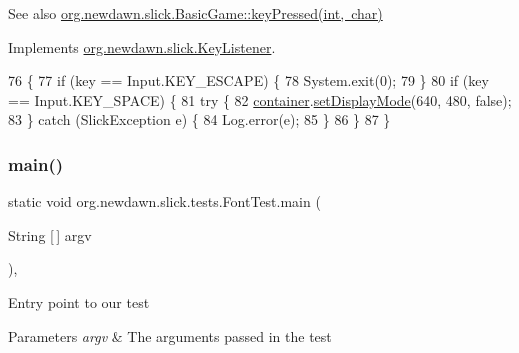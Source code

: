 \begin{DoxySeeAlso}{See also}
\mbox{\hyperlink{classorg_1_1newdawn_1_1slick_1_1_basic_game_a4fbb3345b5abf5ddd54a99466d07f02f}{org.\+newdawn.\+slick.\+Basic\+Game\+::key\+Pressed(int, char)}} 
\end{DoxySeeAlso}


Implements \mbox{\hyperlink{interfaceorg_1_1newdawn_1_1slick_1_1_key_listener_ac0b0568a21ef486c4f51382614c196ef}{org.\+newdawn.\+slick.\+Key\+Listener}}.


\begin{DoxyCode}
76                                             \{
77         \textcolor{keywordflow}{if} (key == Input.KEY\_ESCAPE) \{
78             System.exit(0);
79         \}
80         \textcolor{keywordflow}{if} (key == Input.KEY\_SPACE) \{
81             \textcolor{keywordflow}{try} \{
82                 \mbox{\hyperlink{classorg_1_1newdawn_1_1slick_1_1tests_1_1_font_test_a752b5206f834ae0b0205d67dcb2aa18d}{container}}.\mbox{\hyperlink{classorg_1_1newdawn_1_1slick_1_1_app_game_container_aa2de68db61ddd3917a8edc0177ebdfe3}{setDisplayMode}}(640, 480, \textcolor{keyword}{false});
83             \} \textcolor{keywordflow}{catch} (SlickException e) \{
84                 Log.error(e);
85             \}
86         \}
87     \}
\end{DoxyCode}
\mbox{\label{classorg_1_1newdawn_1_1slick_1_1tests_1_1_font_test_aeaa4c6efeea38900dd2fb188c8661f60}} 
\subsubsection{\texorpdfstring{main()}{main()}}
{\footnotesize\ttfamily static void org.\+newdawn.\+slick.\+tests.\+Font\+Test.\+main (\begin{DoxyParamCaption}\item[{String \mbox{[}$\,$\mbox{]}}]{argv }\end{DoxyParamCaption})\hspace{0.3cm}{\ttfamily [inline]}, {\ttfamily [static]}}

Entry point to our test


\begin{DoxyParams}{Parameters}
{\em argv} & The arguments passed in the test \\
\hline
\end{DoxyParams}

